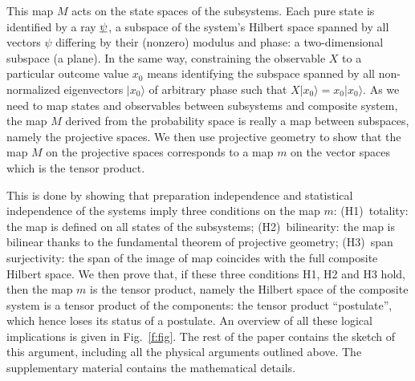 \documentclass[aps,prl,amsmath,amssymb,twocolumn]{revtex4}
\theoremstyle{plain}
\theoremstyle{definition}
\theoremstyle{remark}
\newcommand{\pj}[1] {\underbar{$#1$}}
\def\>{\rangle}
\def\comment#1{}
\begin{document}
	\comment{mettere nel supplementary: We will mainly focus on
		kine\-mati\-cal\-ly-inde\-pen\-dent systems, namely no
		superselection rules or other restrictions to the state space are
		present: it is possible to prepare each subsystem of a composite
		system in a state that is independent of the other systems
		(preparation independence).  This is the only case in which the
		tensor product can be properly employed: the Hilbert space of
		composite systems that have restrictions is {\em not} the tensor
		product of the component spaces, but a subspace of it (e.g.~the
		anti-symmetric subspace for fermions). Typically this is ignored in
		the literature, since the tensor product formalism is very
		convenient and is often used also in these cases, and superselection
		rules are typically avoidable \cite{susskind,zanardi,zanardilloyd}.
	}
	
	This map $M$ acts on the state spaces of the subsystems. Each pure
	state is identified by a ray $\pj{\psi}$, a subspace of the system's
	Hilbert space spanned by all vectors $\psi$ differing by their
	(nonzero) modulus and phase: a two-dimensional subspace (a plane). In
	the same way, constraining the observable $X$ to a particular outcome
	value $x_0$ means identifying the subspace spanned by all
	non-normalized eigenvectors $|x_0\>$ of arbitrary phase such that
	$X | x_0 \> = x_0 |x_0\>$. As we need to map states and observables
	between subsystems and composite system, the map $M$ derived from the
	probability space is really a map between subspaces, namely the
	projective spaces. We then use projective geometry to show that the
	map $M$ on the projective spaces corresponds to a map $m$ on the
	vector spaces which is the tensor product.
	
	This is done by showing that preparation independence and statistical
	independence of the systems imply three conditions on the map $m$:
	(H1)~totality: the map is defined on all states of the subsystems;
	(H2)~bilinearity: the map is bilinear thanks to the fundamental
	theorem of projective geometry; (H3)~span surjectivity: the span of
	the image of map coincides with the full composite Hilbert space.  We
	then prove that, if these three conditions H1, H2 and H3 hold, then
	the map $m$ is the tensor product, namely the Hilbert space of the
	composite system is a tensor product of the components: the tensor
	product ``postulate'', which hence loses its status of a postulate. An
	overview of all these logical implications is given in
	Fig.~\ref{f:fig}. The rest of the paper contains the sketch of this
	argument, including all the physical arguments outlined above. The
	supplementary material contains the mathematical details.
	
\end{document}
